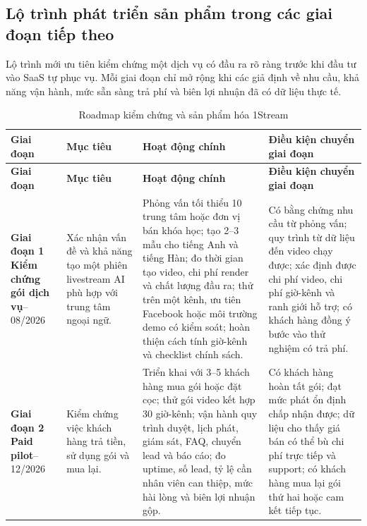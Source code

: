 \subsection{Lộ trình phát triển sản phẩm trong các giai đoạn tiếp theo}

Lộ trình mới ưu tiên kiểm chứng một dịch vụ có đầu ra rõ ràng trước khi đầu tư
vào SaaS tự phục vụ. Mỗi giai đoạn chỉ mở rộng khi các giả định về nhu cầu, khả
năng vận hành, mức sẵn sàng trả phí và biên lợi nhuận đã có dữ liệu thực tế.

\begin{center}
\small
\setlength{\tabcolsep}{4pt}
\renewcommand{\arraystretch}{1.25}
\begin{longtable}{|>{\raggedright\arraybackslash}p{2.3cm}|
    >{\raggedright\arraybackslash}p{3.7cm}|
    >{\raggedright\arraybackslash}p{4.4cm}|
    >{\raggedright\arraybackslash}p{4.2cm}|}
    \caption{Roadmap kiểm chứng và sản phẩm hóa 1Stream}
    \label{tab:roadmap-1stream} \\
    \hline
    \rowcolor{blue!15}
    \textbf{Giai đoạn} & \textbf{Mục tiêu} & \textbf{Hoạt động chính} &
    \textbf{Điều kiện chuyển giai đoạn} \\ \hline
    \endfirsthead

    \hline
    \rowcolor{blue!15}
    \textbf{Giai đoạn} & \textbf{Mục tiêu} & \textbf{Hoạt động chính} &
    \textbf{Điều kiện chuyển giai đoạn} \\ \hline
    \endhead

    \textbf{Giai đoạn 1}\newline
    \textbf{Kiểm chứng gói dịch vụ}\newline
    06--08/2026 &
    Xác nhận vấn đề và khả năng tạo một phiên livestream AI phù hợp với trung
    tâm ngoại ngữ. &
    Phỏng vấn tối thiểu 10 trung tâm hoặc đơn vị bán khóa học; tạo 2--3 mẫu cho
    tiếng Anh và tiếng Hàn; đo thời gian tạo video, chi phí render và chất lượng
    đầu ra; thử trên một kênh, ưu tiên Facebook hoặc môi trường demo có kiểm
    soát; hoàn thiện cách tính giờ-kênh và checklist chính sách. &
    Có bằng chứng nhu cầu từ phỏng vấn; quy trình từ dữ liệu đến video chạy được;
    xác định được chi phí video, chi phí giờ-kênh và ranh giới hỗ trợ; có khách
    hàng đồng ý bước vào thử nghiệm có trả phí. \\ \hline

    \textbf{Giai đoạn 2}\newline
    \textbf{Paid pilot}\newline
    09--12/2026 &
    Kiểm chứng việc khách hàng trả tiền, sử dụng gói và mua lại. &
    Triển khai với 3--5 khách hàng mua gói hoặc đặt cọc; thử gói video kết hợp
    30 giờ-kênh; vận hành quy trình duyệt, lịch phát, giám sát, FAQ, chuyển lead
    và báo cáo; đo uptime, số lead, tỷ lệ cần nhân viên can thiệp, mức hài lòng
    và biên lợi nhuận gộp. &
    Có khách hàng hoàn tất gói; đạt mức phát ổn định chấp nhận được; dữ liệu cho
    thấy giá bán có thể bù chi phí trực tiếp và support; có khách hàng mua lại
    gói thứ hai hoặc cam kết tiếp tục. \\ \hline


\end{longtable}
\end{center}
